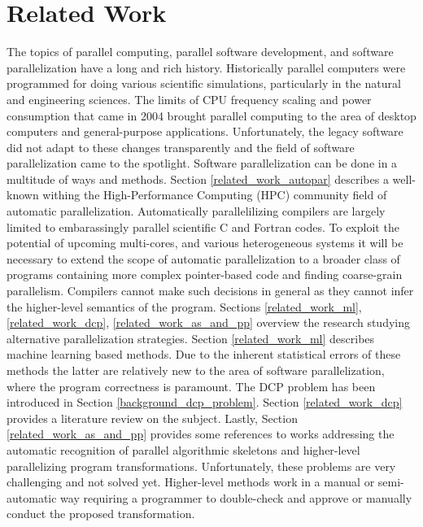 \chapter{Related Work}
\label{related_work}
\quad The topics of parallel computing, parallel software development, and software parallelization have a long and rich history. Historically parallel computers were programmed for doing various scientific simulations, particularly in the natural and engineering sciences. The limits of CPU frequency scaling and power consumption that came in 2004 brought parallel computing to the area of desktop computers and general-purpose applications. Unfortunately, the legacy software did not adapt to these changes transparently and the field of software parallelization came to the spotlight. Software parallelization can be done in a multitude of ways and methods.\newline\null
\quad Section \ref{related_work_autopar} describes a well-known withing the High-Performance Computing (HPC) community field of automatic parallelization. Automatically parallelilizing compilers are largely limited to embarassingly parallel scientific C and Fortran codes. To exploit the potential of upcoming multi-cores, and various heterogeneous systems it will be necessary to extend the scope of automatic parallelization to a broader class of programs containing more complex pointer-based code and finding coarse-grain parallelism. Compilers cannot make such decisions in general as they cannot infer the higher-level semantics of the program. Sections \ref{related_work_ml}, \ref{related_work_dcp}, \ref{related_work_as_and_pp} overview the research studying alternative parallelization strategies. Section \ref{related_work_ml} describes machine learning based methods. Due to the inherent statistical errors of these methods the latter are relatively new to the area of software parallelization, where the program correctness is paramount. The DCP problem has been introduced in Section \ref{background_dcp_problem}. Section \ref{related_work_dcp} provides a literature review on the subject. Lastly, Section \ref{related_work_as_and_pp} provides some references to works addressing the automatic recognition of parallel algorithmic skeletons and higher-level parallelizing program transformations. Unfortunately, these problems are very challenging and not solved yet. Higher-level methods work in a manual or semi-automatic way requiring a programmer to double-check and approve or manually conduct the proposed transformation.
